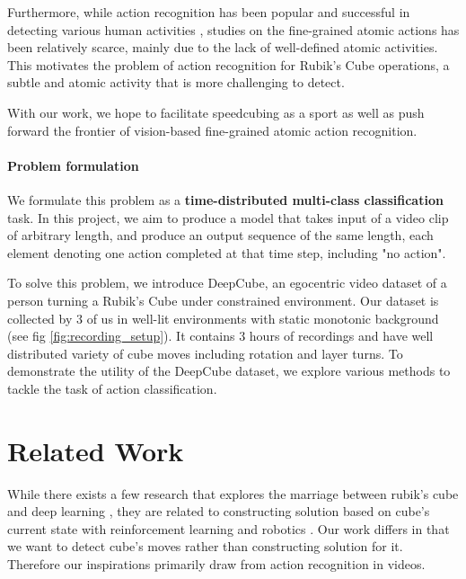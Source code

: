 \documentclass[10pt,twocolumn,letterpaper]{article}
\begin{document}
Furthermore, while action recognition has been popular and successful in detecting various human activities \cite{charades, ava, kinetics, finegym, hvu}, studies on the fine-grained atomic actions has been relatively scarce, mainly due to the lack of well-defined atomic activities. This motivates the problem of action recognition for Rubik's Cube operations, a subtle and atomic activity that is more challenging to detect.

With our work, we hope to facilitate speedcubing as a sport as well as push forward the frontier of vision-based fine-grained atomic action recognition.

\vspace{-2mm}
\paragraph{Problem formulation}
We formulate this problem as a \textbf{time-distributed multi-class classification} task. In this project, we aim to produce a model that takes input of a video clip of arbitrary length, and produce an output sequence of the same length, each element denoting one action completed at that time step, including "no action". 


To solve this problem, we introduce DeepCube, an egocentric video dataset of a person turning a Rubik's Cube under constrained environment. Our dataset is collected by 3 of us in well-lit environments with static monotonic background (see fig \ref{fig:recording_setup}). It contains 3 hours of recordings and have well distributed variety of cube moves including rotation and layer turns. To demonstrate the utility of the DeepCube dataset, we explore various methods \cite{lrcn,i3d,r3d} to tackle the task of action classification.

\section{Related Work}

While there exists a few research that explores the marriage between rubik's cube and deep learning \cite{cube_robotics, cube_rl}, they are related to constructing solution based on cube's current state with reinforcement learning \cite{cube_rl} and robotics \cite{cube_robotics}. Our work differs in that we want to detect cube's moves rather than constructing solution for it. Therefore our inspirations primarily draw from action recognition in videos. 
\vspace{-2mm}
\end{document}
